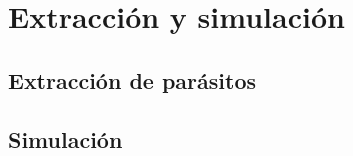\chapter{Extracción y simulación}

\section{Extracción de parásitos}\label{cap:extraccion}

\section{Simulación}\label{cap:simulacion}
